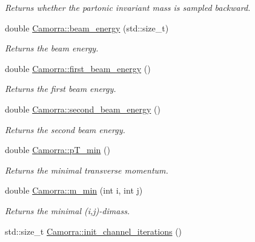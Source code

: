 \begin{DoxyCompactItemize}
\begin{DoxyCompactList}\small\item\em Returns whether the partonic invariant mass is sampled backward. \end{DoxyCompactList}\item 
\hypertarget{a00798_a8428a1dc1126b5c64d4c2b3eac982a08}{
double \hyperlink{a00798_a8428a1dc1126b5c64d4c2b3eac982a08}{Camorra::beam\_\-energy} (std::size\_\-t)}
\label{a00798_a8428a1dc1126b5c64d4c2b3eac982a08}

\begin{DoxyCompactList}\small\item\em Returns the beam energy. \end{DoxyCompactList}\item 
\hypertarget{a00798_ae37732a0d7d978fed452febc85956ba6}{
double \hyperlink{a00798_ae37732a0d7d978fed452febc85956ba6}{Camorra::first\_\-beam\_\-energy} ()}
\label{a00798_ae37732a0d7d978fed452febc85956ba6}

\begin{DoxyCompactList}\small\item\em Returns the first beam energy. \end{DoxyCompactList}\item 
\hypertarget{a00798_a2a0730cc45130987f9f09f378e63fc8d}{
double \hyperlink{a00798_a2a0730cc45130987f9f09f378e63fc8d}{Camorra::second\_\-beam\_\-energy} ()}
\label{a00798_a2a0730cc45130987f9f09f378e63fc8d}

\begin{DoxyCompactList}\small\item\em Returns the second beam energy. \end{DoxyCompactList}\item 
\hypertarget{a00798_aa3d1630b235e757af1d3aafe0df9eb6e}{
double \hyperlink{a00798_aa3d1630b235e757af1d3aafe0df9eb6e}{Camorra::pT\_\-min} ()}
\label{a00798_aa3d1630b235e757af1d3aafe0df9eb6e}

\begin{DoxyCompactList}\small\item\em Returns the minimal transverse momentum. \end{DoxyCompactList}\item 
\hypertarget{a00798_ae0a0c42e993901a0a08f231fd1b42d40}{
double \hyperlink{a00798_ae0a0c42e993901a0a08f231fd1b42d40}{Camorra::m\_\-min} (int i, int j)}
\label{a00798_ae0a0c42e993901a0a08f231fd1b42d40}

\begin{DoxyCompactList}\small\item\em Returns the minimal (i,j)-\/dimass. \end{DoxyCompactList}\item 
\hypertarget{a00798_a1ea95549577a97313b586b08daf9d6e1}{
std::size\_\-t \hyperlink{a00798_a1ea95549577a97313b586b08daf9d6e1}{Camorra::init\_\-channel\_\-iterations} ()}
\label{a00798_a1ea95549577a97313b586b08daf9d6e1}


\end{DoxyCompactItemize}
